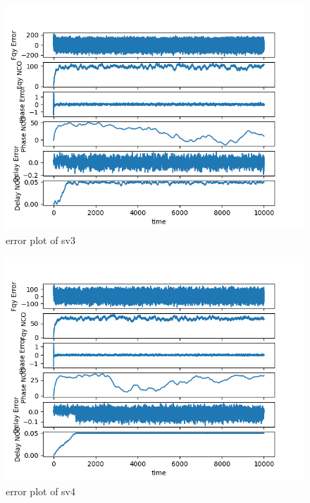 \begin{figure}[ht]
\centering
\includegraphics[width=1\textwidth]{figs/sv3_trkng.png}
\centering
\captionsetup{justification=centering}
\caption{error plot of sv3}
\end{figure}

\begin{figure}[ht]
\centering
\includegraphics[width=1\textwidth]{figs/sv4_trkng.png}
\centering
\captionsetup{justification=centering}
\caption{error plot of sv4}
\end{figure}

